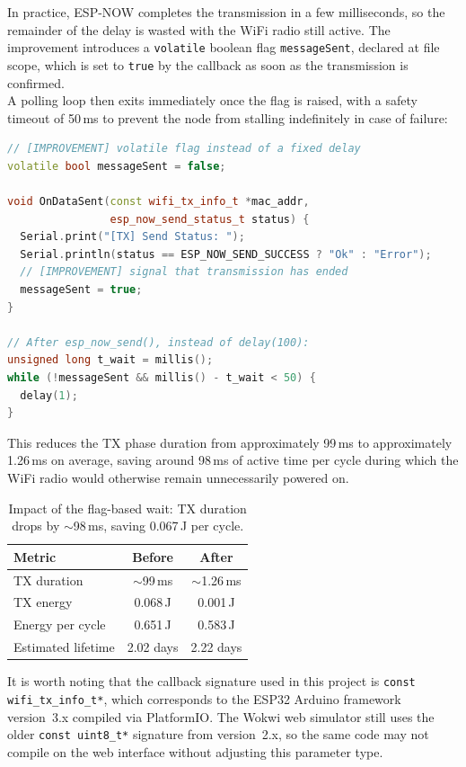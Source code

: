 \documentclass[a4paper,11pt]{article}
\begin{document}
In practice, ESP-NOW completes the transmission in a few milliseconds, so the
remainder of the delay is wasted with the WiFi radio still active. The improvement introduces a \texttt{volatile} boolean flag \texttt{messageSent},
declared at file scope, which is set to \texttt{true} by the callback as soon as the transmission is confirmed.\\ 

A polling loop then exits immediately once the flag is raised, with a safety timeout of 50\,ms to prevent the node from stalling indefinitely in case of failure:

\begin{lstlisting}[language=C++]
// [IMPROVEMENT] volatile flag instead of a fixed delay
volatile bool messageSent = false;

void OnDataSent(const wifi_tx_info_t *mac_addr,
                esp_now_send_status_t status) {
  Serial.print("[TX] Send Status: ");
  Serial.println(status == ESP_NOW_SEND_SUCCESS ? "Ok" : "Error");
  // [IMPROVEMENT] signal that transmission has ended
  messageSent = true;
}

// After esp_now_send(), instead of delay(100):
unsigned long t_wait = millis();
while (!messageSent && millis() - t_wait < 50) {
  delay(1);
}
\end{lstlisting}

This reduces the TX phase duration from approximately 99\,ms to approximately
1.26\,ms on average, saving around 98\,ms of active time per cycle during which
the WiFi radio would otherwise remain unnecessarily powered on.

\begin{table}[H]
\centering
\begin{tabular}{lcc}
\toprule
\textbf{Metric} & \textbf{Before} & \textbf{After} \\
\midrule
TX duration        & $\sim$99\,ms   & $\sim$1.26\,ms \\
TX energy          & 0.068\,J  & 0.001\,J \\
Energy per cycle   & 0.651\,J  & 0.583\,J \\
Estimated lifetime & 2.02 days & 2.22 days \\
\bottomrule
\end{tabular}
\caption{Impact of the flag-based wait: TX duration drops by $\sim$98\,ms,
saving 0.067\,J per cycle.}
\end{table}

It is worth noting that the callback signature used in this project is
\texttt{const wifi\_tx\_info\_t*}, which corresponds to the ESP32 Arduino framework
version~3.x compiled via PlatformIO. The Wokwi web simulator still uses the older
\texttt{const uint8\_t*} signature from version~2.x, so the same code may not
compile on the web interface without adjusting this parameter type.
\end{document}
